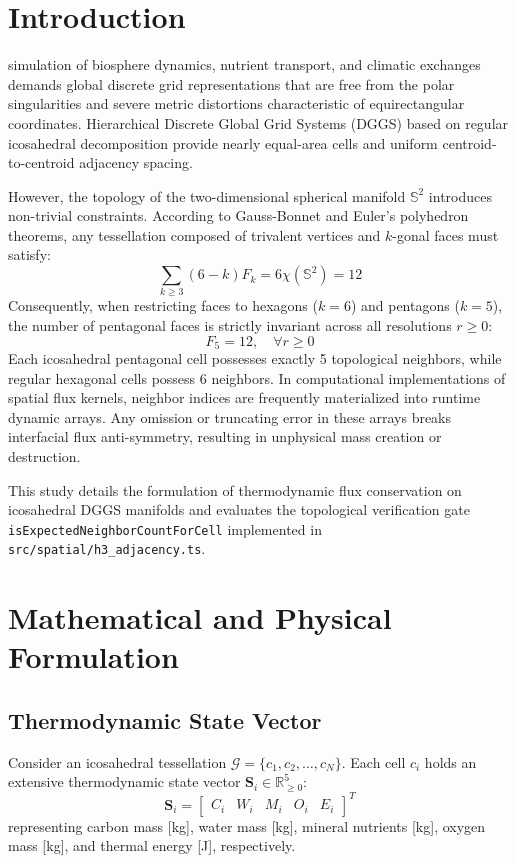 \documentclass[10pt,journal,compsoc]{IEEEtran}
\begin{document}
\section{Introduction}
 simulation of biosphere dynamics, nutrient transport, and climatic exchanges demands global discrete grid representations that are free from the polar singularities and severe metric distortions characteristic of equirectangular coordinates. Hierarchical Discrete Global Grid Systems (DGGS) based on regular icosahedral decomposition provide nearly equal-area cells and uniform centroid-to-centroid adjacency spacing.

However, the topology of the two-dimensional spherical manifold $\mathbb{S}^2$ introduces non-trivial constraints. According to Gauss-Bonnet and Euler's polyhedron theorems, any tessellation composed of trivalent vertices and $k$-gonal faces must satisfy:
\begin{equation}
\sum_{k \ge 3} (6 - k) F_k = 6 \chi(\mathbb{S}^2) = 12
\end{equation}
Consequently, when restricting faces to hexagons ($k=6$) and pentagons ($k=5$), the number of pentagonal faces is strictly invariant across all resolutions $r \ge 0$:
\begin{equation}
F_5 = 12, \quad \forall r \ge 0
\end{equation}
Each icosahedral pentagonal cell possesses exactly 5 topological neighbors, while regular hexagonal cells possess 6 neighbors. In computational implementations of spatial flux kernels, neighbor indices are frequently materialized into runtime dynamic arrays. Any omission or truncating error in these arrays breaks interfacial flux anti-symmetry, resulting in unphysical mass creation or destruction.

This study details the formulation of thermodynamic flux conservation on icosahedral DGGS manifolds and evaluates the topological verification gate \texttt{isExpectedNeighborCountForCell} implemented in \texttt{src/spatial/h3\_adjacency.ts}.

\section{Mathematical and Physical Formulation}

\subsection{Thermodynamic State Vector}
Consider an icosahedral tessellation $\mathcal{G} = \{c_1, c_2, \dots, c_N\}$. Each cell $c_i$ holds an extensive thermodynamic state vector $\mathbf{S}_i \in \mathbb{R}^5_{\ge 0}$:
\begin{equation}
\mathbf{S}_i = \begin{bmatrix} C_i & W_i & M_i & O_i & E_i \end{bmatrix}^T
\end{equation}
representing carbon mass [kg], water mass [kg], mineral nutrients [kg], oxygen mass [kg], and thermal energy [J], respectively.
\end{document}
